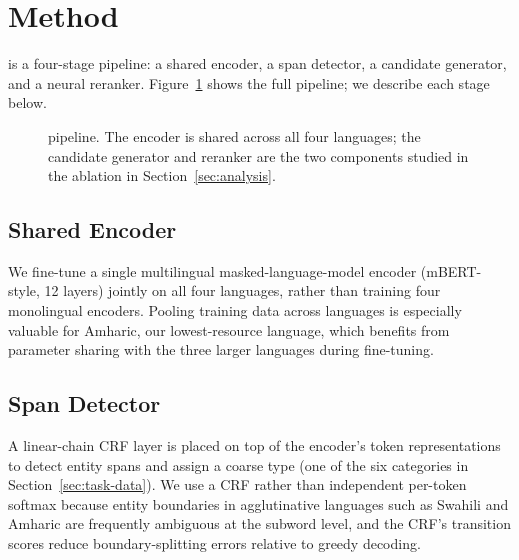 \section{Method}
\label{sec:method}

 is a four-stage pipeline: a shared encoder, a span
detector, a candidate generator, and a neural reranker. Figure~\ref{fig:architecture}
shows the full pipeline; we describe each stage below.

\begin{figure}[t]
\centering
{}
\caption{ pipeline. The encoder is shared across all four
languages; the candidate generator and reranker are the two components
studied in the ablation in Section~\ref{sec:analysis}.}
\label{fig:architecture}
\end{figure}

\subsection{Shared Encoder}
We fine-tune a single multilingual masked-language-model encoder
(mBERT-style, 12 layers) jointly on all four languages, rather than
training four monolingual encoders. Pooling training data across
languages is especially valuable for Amharic, our lowest-resource
language, which benefits from parameter sharing with the three larger
languages during fine-tuning.

\subsection{Span Detector}
A linear-chain CRF layer is placed on top of the encoder's token
representations to detect entity spans and assign a coarse type (one of
the six categories in Section~\ref{sec:task-data}). We use a CRF rather
than independent per-token softmax because entity boundaries in
agglutinative languages such as Swahili and Amharic are frequently
ambiguous at the subword level, and the CRF's transition scores reduce
boundary-splitting errors relative to greedy decoding.

